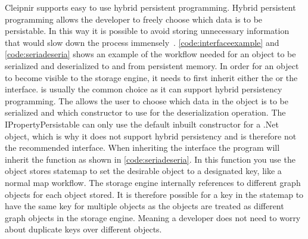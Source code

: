 Cleipnir supports easy to use hybrid persistent programming. Hybrid persistent programming allows the developer to freely choose which data is to be persistable. In this way it is possible to avoid storing unnecessary information that would slow down the process immensely~\cite[p.~9-10]{PAPER:PaxosCleipnir}. \autoref{code:interfaceexample} and \autoref{code:seriadeseria} shows an example of the workflow needed for an object to be serialized and deserialized to and from persistent memory. In order for an object to become visible to the storage engine, it needs to first inherit either the  or the  interface.  is usually the common choice as it can support hybrid persistency programming. The  allows the user to choose which data in the object is to be serialized and which constructor to use for the deserialization operation. The IPropertyPersistable can only use the default inbuilt constructor for a .Net object, which is why it does not support hybrid persistency and is therefore not the recommended interface.
When inheriting the  interface the program will inherit the  function as shown in \autoref{code:seriadeseria}. In this function you use the object stores statemap to set the desirable object to a designated key, like a normal map workflow. The storage engine internally references to different graph objects for each object stored. It is therefore possible for a key in the statemap to have the same key for multiple objects as the objects are treated as different graph objects in the storage engine. Meaning a developer does not need to worry about duplicate keys over different objects.

